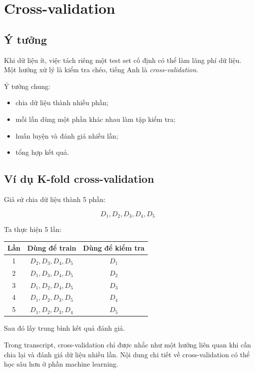 \section{Cross-validation}

\subsection{Ý tưởng}

Khi dữ liệu ít, việc tách riêng một test set cố định có thể làm lãng phí dữ liệu. Một hướng xử lý là kiểm tra chéo, tiếng Anh là \textit{cross-validation}.

Ý tưởng chung:

\begin{itemize}
    \item chia dữ liệu thành nhiều phần;
    \item mỗi lần dùng một phần khác nhau làm tập kiểm tra;
    \item huấn luyện và đánh giá nhiều lần;
    \item tổng hợp kết quả.
\end{itemize}

\subsection{Ví dụ K-fold cross-validation}

Giả sử chia dữ liệu thành 5 phần:

\[
    D_1,D_2,D_3,D_4,D_5
\]

Ta thực hiện 5 lần:

\begin{center}
\begin{tabular}{ccc}
\toprule
Lần & Dùng để train & Dùng để kiểm tra \\
\midrule
1 & $D_2,D_3,D_4,D_5$ & $D_1$ \\
2 & $D_1,D_3,D_4,D_5$ & $D_2$ \\
3 & $D_1,D_2,D_4,D_5$ & $D_3$ \\
4 & $D_1,D_2,D_3,D_5$ & $D_4$ \\
5 & $D_1,D_2,D_3,D_4$ & $D_5$ \\
\bottomrule
\end{tabular}
\end{center}

Sau đó lấy trung bình kết quả đánh giá.

\begin{luuy}
Trong transcript, cross-validation chỉ được nhắc như một hướng liên quan khi cần chia lại và đánh giá dữ liệu nhiều lần. Nội dung chi tiết về cross-validation có thể học sâu hơn ở phần machine learning.
\end{luuy}

